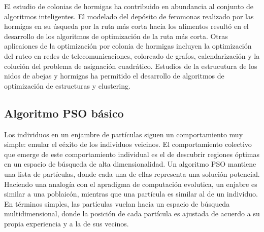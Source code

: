 \documentclass{article}
\begin{document}
El estudio de colonias de hormigas ha contribuido en abundancia al conjunto de algoritmos inteligentes.
El modelado del depósito de feromonas realizado por las hormigas en su úsqueda por la ruta más corta hacia los alimentos resultó en el desarrollo de los algoritmos de optimización de la ruta más corta.
Otras aplicaiones de la optimización por colonia de hormigas incluyen la optimización del ruteo en redes de telecomunicaciones, coloreado de grafos, calendarización y la colución del problema de asignación cuadrático.
Estudios de la estrucutura de los nidos de abejas y hormigas ha permitido el desarrollo de algoritmos de optimización de estructuras y clustering.




\subsection{Algoritmo PSO básico}
Los individuos en un enjambre de partículas siguen un comportamiento muy simple: emular el eéxito de los individuos veicinos.
El comportamiento colectivo que emerge de este comportamiento individual es el de descubrir regiones óptimas en un espacio de búsqueda de alta dimensionalidad.
Un algoritmo PSO mantiene una lista de partículas, donde cada una de ellas representa una solución potencial.
Haciendo una analogía con el apradigma de computación evolutica, un enjabre es similar a una poblaicón, mientras que una partícula es similar al de un individuo.
En términos simples, las partículas vuelan hacia un espacio de búsqueda multidimensional, donde la posición de cada partícula es ajustada de acuerdo a su propia experiencia y a la de sus vecinos.
\end{document}
